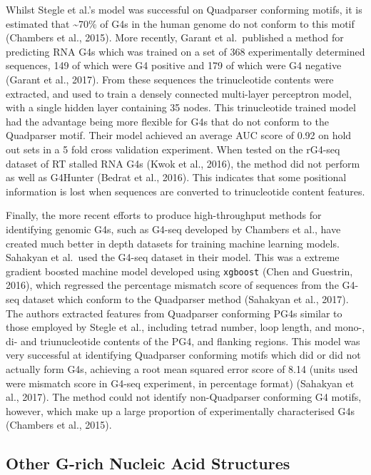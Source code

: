 \documentclass[12pt,a4paper,]{report}
\begin{document}
Whilst Stegle et al.'s model was successful on Quadparser conforming
motifs, it is estimated that \textasciitilde{}70\% of G4s in the human
genome do not conform to this motif (Chambers et al., 2015). More
recently, Garant et al.~published a method for predicting RNA G4s which
was trained on a set of 368 experimentally determined sequences, 149 of
which were G4 positive and 179 of which were G4 negative (Garant et al.,
2017). From these sequences the trinucleotide contents were extracted,
and used to train a densely connected multi-layer perceptron model, with
a single hidden layer containing 35 nodes. This trinucleotide trained
model had the advantage being more flexible for G4s that do not conform
to the Quadparser motif. Their model achieved an average AUC score of
0.92 on hold out sets in a 5 fold cross validation experiment. When
tested on the rG4-seq dataset of RT stalled RNA G4s (Kwok et al., 2016),
the method did not perform as well as G4Hunter (Bedrat et al., 2016).
This indicates that some positional information is lost when sequences
are converted to trinucleotide content features.

Finally, the more recent efforts to produce high-throughput methods for
identifying genomic G4s, such as G4-seq developed by Chambers et al.,
have created much better in depth datasets for training machine learning
models. Sahakyan et al.~used the G4-seq dataset in their model. This was
a extreme gradient boosted machine model developed using
\texttt{xgboost} (Chen and Guestrin, 2016), which regressed the
percentage mismatch score of sequences from the G4-seq dataset which
conform to the Quadparser method (Sahakyan et al., 2017). The authors
extracted features from Quadparser conforming PG4s similar to those
employed by Stegle et al., including tetrad number, loop length, and
mono-, di- and triunucleotide contents of the PG4, and flanking regions.
This model was very successful at identifying Quadparser conforming
motifs which did or did not actually form G4s, achieving a root mean
squared error score of 8.14 (units used were mismatch score in G4-seq
experiment, in percentage format) (Sahakyan et al., 2017). The method
could not identify non-Quadparser conforming G4 motifs, however, which
make up a large proportion of experimentally characterised G4s (Chambers
et al., 2015).

\newpage

\hypertarget{other-g-rich-nucleic-acid-structures}{%
\subsection{Other G-rich Nucleic Acid
Structures}\label{other-g-rich-nucleic-acid-structures}}
\end{document}
